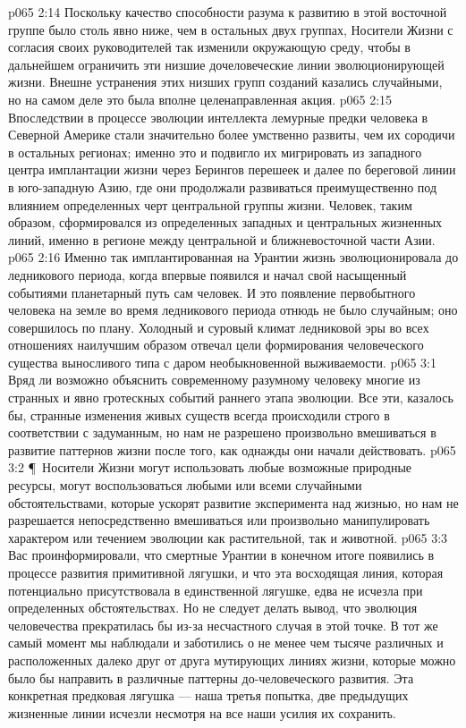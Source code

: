 \vs p065 2:14 Поскольку качество способности разума к развитию в этой восточной группе было столь явно ниже, чем в остальных двух группах, Носители Жизни с согласия своих руководителей так изменили окружающую среду, чтобы в дальнейшем ограничить эти низшие дочеловеческие линии эволюционирующей жизни. Внешне устранения этих низших групп созданий казались случайными, но на самом деле это была вполне целенаправленная акция.
\vs p065 2:15 Впоследствии в процессе эволюции интеллекта лемурные предки человека в Северной Америке стали значительно более умственно развиты, чем их сородичи в остальных регионах; именно это и подвигло их мигрировать из западного центра имплантации жизни через Берингов перешеек и далее по береговой линии в юго\hyp{}западную Азию, где они продолжали развиваться преимущественно под влиянием определенных черт центральной группы жизни. Человек, таким образом, сформировался из определенных западных и центральных жизненных линий, именно в регионе между центральной и ближневосточной части Азии.
\vs p065 2:16 Именно так имплантированная на Урантии жизнь эволюционировала до ледникового периода, когда впервые появился и начал свой насыщенный событиями планетарный путь сам человек. И это появление первобытного человека на земле во время ледникового периода отнюдь не было случайным; оно совершилось по плану. Холодный и суровый климат ледниковой эры во всех отношениях наилучшим образом отвечал цели формирования человеческого существа выносливого типа с даром необыкновенной выживаемости.
\vs p065 3:1 Вряд ли возможно объяснить современному разумному человеку многие из странных и явно гротескных событий раннего этапа эволюции. Все эти, казалось бы, странные изменения живых существ всегда происходили строго в соответствии с задуманным, но нам не разрешено произвольно вмешиваться в развитие паттернов жизни после того, как однажды они начали действовать.
\vs p065 3:2 \P\ Носители Жизни могут использовать любые возможные природные ресурсы, могут воспользоваться любыми или всеми случайными обстоятельствами, которые ускорят развитие эксперимента над жизнью, но нам не разрешается непосредственно вмешиваться или произвольно манипулировать характером или течением эволюции как растительной, так и животной.
\vs p065 3:3 Вас проинформировали, что смертные Урантии в конечном итоге появились в процессе развития примитивной лягушки, и что эта восходящая линия, которая потенциально присутствовала в единственной лягушке, едва не исчезла при определенных обстоятельствах. Но не следует делать вывод, что эволюция человечества прекратилась бы из\hyp{}за несчастного случая в этой точке. В тот же самый момент мы наблюдали и заботились о не менее чем тысяче различных и расположенных далеко друг от друга мутирующих линиях жизни, которые можно было бы направить в различные паттерны до\hyp{}человеческого развития. Эта конкретная предковая лягушка --- наша третья попытка, две предыдущих жизненные линии исчезли несмотря на все наши усилия их сохранить.
